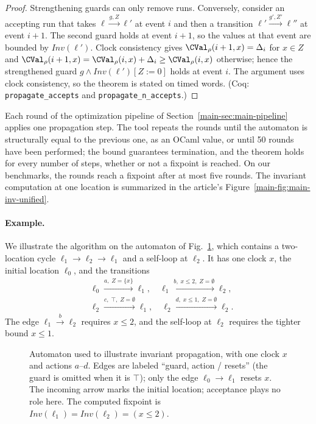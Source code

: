 \begin{proof}
Strengthening guards can only remove runs.  Conversely, consider an accepting
run that takes $\ell\xrightarrow{g,Z}\ell'$ at event $i$ and then a transition
$\ell'\xrightarrow{g',Z'}\ell''$ at event $i+1$.  The second guard holds at event
$i+1$, so the values at that event are bounded by $\mathit{Inv}(\ell')$.  Clock
consistency gives $\CVal_\rho(i+1,x)=\Delta_i$ for $x\in Z$ and
$\CVal_\rho(i+1,x)=\CVal_\rho(i,x)+\Delta_i\ge\CVal_\rho(i,x)$ otherwise; hence
the strengthened guard $g\wedge\mathit{Inv}(\ell')[Z:=0]$ holds at event $i$.
The argument uses clock consistency, so the theorem is stated on timed words.
(Coq: \texttt{propagate\_\allowbreak{}accepts} and
\texttt{propagate\_\allowbreak{}n\_\allowbreak{}accepts}.)
\end{proof}

Each round of the optimization pipeline of Section~\ref{main-sec:main-pipeline}
applies one propagation step.  The tool repeats the rounds until the
automaton is structurally equal to the previous one, as an OCaml value, or
until 50 rounds have been performed; the bound guarantees termination, and the
theorem holds for every number of steps, whether or not a fixpoint is
reached.  On our benchmarks, the rounds reach a fixpoint after at most five
rounds.
The invariant computation at one location is summarized in the article's
Figure~\ref{main-fig:main-inv-unified}.

\paragraph{Example.}
We illustrate the algorithm on the automaton of Fig.~\ref{fig:inv-example},
which contains a two-location cycle $\ell_1\to\ell_2\to\ell_1$ and a self-loop
at $\ell_2$.  It has one clock $x$, the initial location $\ell_0$, and the
transitions
\[
\begin{aligned}
&\ell_0 \xrightarrow{a,\;Z=\{x\}} \ell_1,\quad
 \ell_1 \xrightarrow{b,\;x\le 2,\;Z=\emptyset} \ell_2,\\
&\ell_2 \xrightarrow{c,\;\top,\;Z=\emptyset} \ell_1,\quad
 \ell_2 \xrightarrow{d,\;x\le 1,\;Z=\emptyset} \ell_2.
\end{aligned}
\]
The edge $\ell_1\xrightarrow{b}\ell_2$ requires $x\le2$, and the self-loop at
$\ell_2$ requires the tighter bound $x\le1$.

\begin{figure}[t]
\centering

\caption{Automaton used to illustrate invariant propagation, with one clock $x$
and actions $a$--$d$.  Edges are labeled ``guard, action / resets'' (the guard
is omitted when it is $\top$); only the edge $\ell_0\to\ell_1$ resets $x$.  The
incoming arrow marks the initial location; acceptance plays no role here.  The
computed fixpoint is $\mathit{Inv}(\ell_1)=\mathit{Inv}(\ell_2)=(x\le2)$.}
\label{fig:inv-example}
\end{figure}

